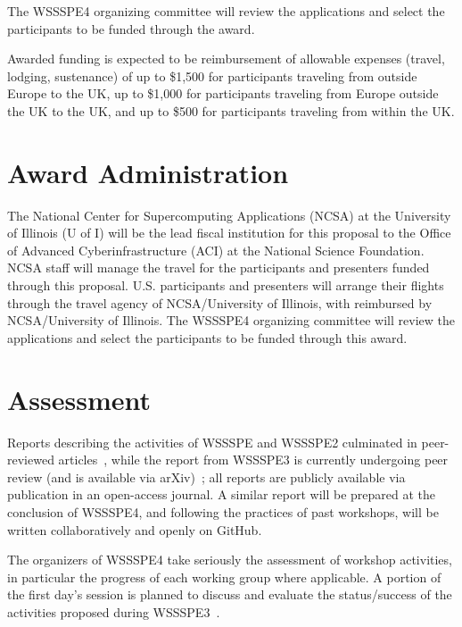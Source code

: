 \documentclass[11pt]{article}
\begin{document}
The WSSSPE4 organizing committee will review the applications and select the participants to be funded through the award. 

Awarded funding is expected to be reimbursement of allowable expenses (travel, lodging, sustenance) of up to \$1,500 for participants traveling from outside Europe to the UK, up to \$1,000 for participants traveling from Europe outside the UK to the UK, and up to \$500 for participants traveling from within the UK.

\section{Award Administration}

The National Center for Supercomputing Applications (NCSA) at the University of Illinois (U of I) will be the lead fiscal institution for this proposal to the Office of Advanced Cyberinfrastructure (ACI) at the National Science Foundation. NCSA staff will manage the travel for the participants and presenters funded through this proposal. U.S. participants and presenters will arrange their flights through the travel agency of NCSA/University of Illinois, with reimbursed by NCSA/University of Illinois. The WSSSPE4 organizing committee will review the applications and select the participants to be funded through this award. 

\section{Assessment}

Reports describing the activities of WSSSPE and WSSSPE2 culminated in peer-reviewed articles~\cite{WSSSPE1,WSSSPE2}, while the report from WSSSPE3 is currently undergoing peer review (and is available via arXiv)~\cite{WSSSPE3}; all reports are publicly available via publication in an open-access journal.
A similar report will be prepared at the conclusion of WSSSPE4, and following the practices of past workshops, will be written collaboratively and openly on GitHub.

The organizers of WSSSPE4 take seriously the assessment of workshop activities, in particular the progress of each working group where applicable.
A portion of the first day's session is planned to discuss and evaluate the status\slash success of the activities proposed during WSSSPE3~\cite{WSSSPE3}.
\end{document}
